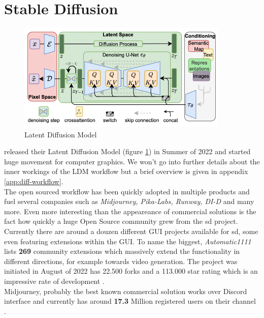 \documentclass[
  a4paper,  %
  twoside,  %
  bibliography=totoc,
  headsepline,
  cleardoublepage=empty,
  parskip=half,
  draft=false
]{scrbook}
\begin{document}
\section{Stable Diffusion}
\begin{figure}[h]
  \centering
  \includegraphics[width=0.9\textwidth]{./graphics/images/latent-diffusion.png}
  \caption{Latent Diffusion Model \cite{rombachHighResolutionImageSynthesis2022}}
  \label{fig:ldm-arch}
\end{figure}
\citet{rombachHighResolutionImageSynthesis2022} released their Latent Diffusion Model (figure \ref{fig:ldm-arch}) in Summer of 2022 and started huge movement for computer graphics. We won't go into further details about the inner workings of the LDM workflow but a brief overview is given in appendix \ref{app:diff-workflow}.\\
The open sourced workflow has been quickly adopted in multiple products and fuel several companies such as \textit{Midjourney, Pika-Labs, Runway, DI-D} and many more. Even more interesting than the appeareance of commercial solutions is the fact how quickly a huge Open Source community grew from the \gls{sd} project. Currently there are around a douzen different GUI projects available for \gls{sd}, some even featuring extensions within the GUI. To name the biggest, \textit{Automatic1111} lists \textbf{269} community extensions which massively extend the functionality in different directions, for example towards video generation. The project was initiated in August of 2022 has 22.500 forks and a 113.000 star rating which is an impressive rate of development \cite{AUTOMATIC1111StablediffusionwebuiStable}. \\
Midjourney, probably the best known commercial solution works over Discord interface and currently has around \textbf{17.3} Million registered users on their channel \cite{midjourneyJoinMidjourneyDiscord}. \\
\end{document}
